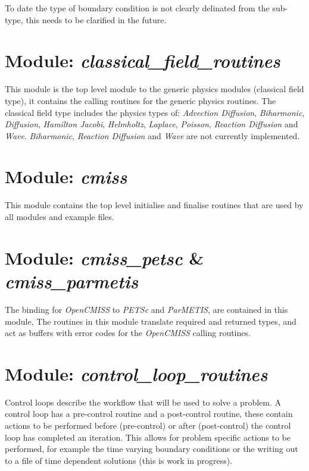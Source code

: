 To date the type of boundary condition is not clearly delinated from the 
sub-type, this needs to be clarified in the future. 


\section{Module: \emph{classical\_field\_routines}}
\label{sec:classicalfieldroutines}

This module is the top level module to the generic physics modules (classical 
field type), it contains the calling routines for the generic physics routines. 
The classical field type includes the physics types of: \emph{Advection
Diffusion}, \emph{Biharmonic}, \emph{Diffusion}, \emph{Hamilton Jacobi}, 
\emph{Helmholtz}, \emph{Laplace}, \emph{Poisson}, \emph{Reaction Diffusion} 
and \emph{Wave}. \emph{Biharmonic}, \emph{Reaction Diffusion} and \emph{Wave} 
are not currently implemented.


\section{Module: \emph{cmiss}}
\label{sec:cmiss}

This module contains the top level initialise and finalise routines that are
used by all modules and example files.


\section{Module: \emph{cmiss\_petsc} \& \emph{cmiss\_parmetis}}
\label{sec:cmisspetscandcmissparmetis}

The binding for \emph{OpenCMISS} to \emph{PETSc} and \emph{ParMETIS}, 
are contained in this module, The routines in this module translate 
required and returned types, and act as buffers with error codes for the 
\emph{OpenCMISS} calling routines.


\section{Module: \emph{control\_loop\_routines}}
\label{sec:controllooproutines}

Control loops describe the workflow that will be used to solve a problem.
A control loop has a pre-control routine and a post-control routine, these 
contain actions to be performed before (pre-control) or after (post-control) 
the control loop has completed an iteration. This allows for problem specific 
actions to be performed, for example the time varying boundary conditions or 
the writing out to a file of time dependent solutions (this is work in
progress).

